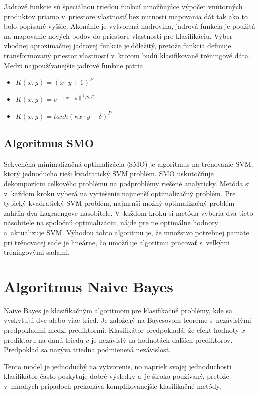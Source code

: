 Jadrové funkcie sú špeciálnou triedou funkcií umožňujúce výpočet vnútorných produktov priamo v~priestore vlastností bez nutnosti mapovania dát tak ako to bolo popísané vyššie. 
Akonáhle je vytvorená nadrovina, jadrová funkcia je použitá na mapovanie nových bodov do priestoru vlastností pre klasifikáciu.
\newpage
Výber vhodnej aproximačnej jadrovej funkcie je dôležitý, pretože funkcia definuje transformovaný priestor vlastností v~ktorom budú klasifikované tréningové dáta. Medzi najpoužívanejšie jadrové funkcie patria
\begin{itemize}
	\item $K(x,y) = (x \cdot y + 1)^{P}$
	\item $K(x,y) = e^{- {\parallel x - y \parallel}^{2}/ {2\sigma}^{2}}$
	\item $K(x,y) = tanh (\kappa x \cdot y -\delta)^{P}$
\end{itemize}


\subsection{Algoritmus SMO}

Sekvenčná minimalizačná optimalizácia (SMO) je algoritmus na trénovanie SVM, ktorý jednoducho rieši kvadratický SVM problém. SMO uskutočňuje dekompozíciu celkového problému na podproblémy riešené analyticky. Metóda si v~každom kroku vyberá na vyriešenie najmenší optimalizačný problém. Pre typický kvadratický SVM problém, najmenší možný optimalizačný problém zahŕňa dva Lagraengove násobitele. V~každom kroku si metóda vyberia dva tieto násobitele na spoločnú optimalizáciu, nájde pre ne optimálne hodnoty a~aktualizuje SVM. Výhodou tohto algoritmu je, že množstvo potrebnej pamäte pri trénovacej sade je lineárne, čo umožňuje algoritmu pracovať s~veľkými tréningovými sadami. 
 
\section{Algoritmus Naive Bayes}

Naive Bayes je klasifikačným algoritmom pre klasifikačné problémy, kde sa vyskytujú dve alebo viac tried. Je založený na Bayesovom teoréme s~nezávislými predpokladmi medzi prediktormi. Klasifikátor predpokladá, že efekt hodnoty $x$ prediktoru na danú triedu $c$ je nezávislý na hodnotách ďaľších prediktorov. Predpoklad sa nazýva triedna podmienená nezávislosť. 

Tento model je jednoduchý na vytvorenie, no napriek svojej jednoduchosti klasifikátor často poskytuje dobré výsledky a~je široko používaný, pretože v~mnohých prípadoch prekonáva komplikovanejšie klasifikačné metódy.

